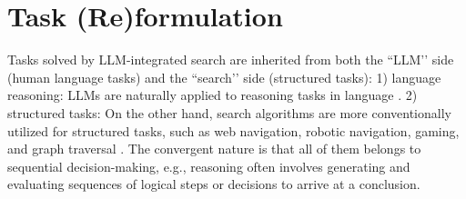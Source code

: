 
\section{Task (Re)formulation}
\label{sec:task_unify}
Tasks solved by LLM-integrated search are inherited from both the ``LLM’’ side (human language tasks) and the ``search’’ side (structured tasks): 
1) language reasoning: LLMs are naturally applied to reasoning tasks in language \citep{wei2022chain}.
2) structured tasks: On the other hand, search algorithms are more conventionally utilized for structured tasks, such as web navigation, robotic navigation, gaming, and graph traversal \citep{russell2010artificial,sutton2018reinforcement}.
The convergent nature is that all of them belongs to sequential decision-making, e.g., reasoning often involves generating and evaluating sequences of logical steps or decisions to arrive at a conclusion.

